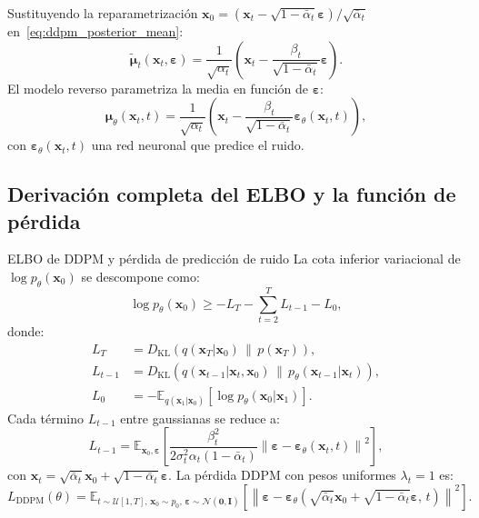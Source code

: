 Sustituyendo la reparametrización $\bm{x}_0 = (\bm{x}_t - \sqrt{1-\bar{\alpha}_t}
\bm{\varepsilon})/\sqrt{\bar{\alpha}_t}$ en~\eqref{eq:ddpm_posterior_mean}:
\begin{equation}
  \tilde{\bm{\mu}}_t(\bm{x}_t,\bm{\varepsilon})
  = \frac{1}{\sqrt{\alpha_t}}\!\left(\bm{x}_t
  - \frac{\beta_t}{\sqrt{1-\bar{\alpha}_t}}\bm{\varepsilon}\right).
  \label{eq:ddpm_posterior_reparametrizado}
\end{equation}
El modelo reverso parametriza la media en función de $\bm{\varepsilon}$:
\begin{equation}
  \bm{\mu}_\theta(\bm{x}_t,t)
  = \frac{1}{\sqrt{\alpha_t}}\!\left(\bm{x}_t
  - \frac{\beta_t}{\sqrt{1-\bar{\alpha}_t}}\bm{\varepsilon}_\theta(\bm{x}_t,t)\right),
  \label{eq:ddpm_mu_theta}
\end{equation}
con $\bm{\varepsilon}_\theta(\bm{x}_t,t)$ una red neuronal que predice el ruido.

\subsection{Derivación completa del ELBO y la función de pérdida}
\label{subsec:ddpm_elbo}

\begin{teorema}{ELBO de DDPM y pérdida de predicción de ruido}
\label{thm:ddpm_elbo}
La cota inferior variacional de $\log p_\theta(\bm{x}_0)$ se descompone como:
\begin{equation}
  \log p_\theta(\bm{x}_0)
  \geq -L_T - \sum_{t=2}^{T} L_{t-1} - L_0,
  \label{eq:ddpm_elbo}
\end{equation}
donde:
\begin{align}
  L_T &= D_{\mathrm{KL}}\!\left(q(\bm{x}_T|\bm{x}_0)\,\|\,p(\bm{x}_T)\right),
  \label{eq:lt}\\
  L_{t-1} &= D_{\mathrm{KL}}\!\left(q(\bm{x}_{t-1}|\bm{x}_t,\bm{x}_0)\,\|\,
  p_\theta(\bm{x}_{t-1}|\bm{x}_t)\right),
  \label{eq:lt-1}\\
  L_0 &= -\mathbb{E}_{q(\bm{x}_1|\bm{x}_0)}\!\left[\log p_\theta(\bm{x}_0|\bm{x}_1)\right].
  \label{eq:l0}
\end{align}
Cada término $L_{t-1}$ entre gaussianas se reduce a:
\begin{equation}
  L_{t-1}
  = \mathbb{E}_{\bm{x}_0,\bm{\varepsilon}}\!\left[
  \frac{\beta_t^2}{2\sigma_t^2\alpha_t(1-\bar{\alpha}_t)}
  \left\|\bm{\varepsilon} - \bm{\varepsilon}_\theta(\bm{x}_t,t)\right\|^2
  \right],
  \label{eq:lt-1_simple}
\end{equation}
con $\bm{x}_t = \sqrt{\bar{\alpha}_t}\bm{x}_0 + \sqrt{1-\bar{\alpha}_t}\bm{\varepsilon}$.
La pérdida DDPM con pesos uniformes $\lambda_t = 1$ es:
\begin{equation}
  L_{\mathrm{DDPM}}(\theta)
  = \mathbb{E}_{t\sim\mathcal{U}[1,T],\,\bm{x}_0\sim p_0,\,
  \bm{\varepsilon}\sim\mathcal{N}(\bm{0},\bm{I})}\!\left[
  \left\|\bm{\varepsilon} - \bm{\varepsilon}_\theta\!\left(\sqrt{\bar{\alpha}_t}\bm{x}_0
  + \sqrt{1-\bar{\alpha}_t}\bm{\varepsilon},\,t\right)\right\|^2
  \right].
  \label{eq:ddpm_loss}
\end{equation}
\end{teorema}


